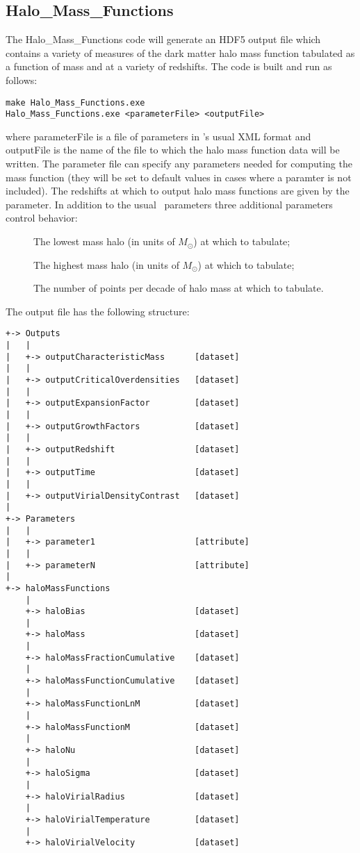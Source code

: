 \subsection{{\normalfont \ttfamily Halo\_Mass\_Functions}}

The {\normalfont \ttfamily Halo\_Mass\_Functions} code will generate an HDF5 output file which contains a variety of measures of the dark matter halo mass function tabulated as a function of mass and at a variety of redshifts. The code is built and run as follows:
\begin{verbatim}
make Halo_Mass_Functions.exe
Halo_Mass_Functions.exe <parameterFile> <outputFile>
\end{verbatim}
where {\normalfont \ttfamily parameterFile} is a file of parameters in \glc's usual XML format and {\normalfont \ttfamily outputFile} is the name of the file to which the halo mass function data will be written. The parameter file can specify any parameters needed for computing the mass function (they will be set to default values in cases where a paramter is not included). The redshifts at which to output halo mass functions are given by the {\normalfont \ttfamily [outputRedshifts]} parameter. In addition to the usual \glc\ parameters three additional parameters control behavior:
\begin{description}
\item [{\normalfont \ttfamily [haloMassFunctionsMassMinimum]}] The lowest mass halo (in units of $M_\odot$) at which to tabulate;
\item [{\normalfont \ttfamily [haloMassFunctionsMassMaximum]}] The highest mass halo (in units of $M_\odot$) at which to tabulate;
\item [{\normalfont \ttfamily [haloMassFunctionsPointsPerDecade]}] The number of points per decade of halo mass at which to tabulate.
\end{description}
The output file has the following structure:
\begin{verbatim}
+-> Outputs
|   |
|   +-> outputCharacteristicMass      [dataset]
|   |
|   +-> outputCriticalOverdensities   [dataset]
|   |
|   +-> outputExpansionFactor         [dataset]
|   |
|   +-> outputGrowthFactors           [dataset]
|   |
|   +-> outputRedshift                [dataset]
|   |
|   +-> outputTime                    [dataset]
|   |
|   +-> outputVirialDensityContrast   [dataset]
|    
+-> Parameters
|   |
|   +-> parameter1                    [attribute]
|   |
|   +-> parameterN                    [attribute]
|    
+-> haloMassFunctions
    |
    +-> haloBias                      [dataset]
    |
    +-> haloMass                      [dataset]
    |
    +-> haloMassFractionCumulative    [dataset]
    |
    +-> haloMassFunctionCumulative    [dataset]
    |
    +-> haloMassFunctionLnM           [dataset]
    |
    +-> haloMassFunctionM             [dataset]
    |
    +-> haloNu                        [dataset]
    |
    +-> haloSigma                     [dataset]
    |
    +-> haloVirialRadius              [dataset]
    |
    +-> haloVirialTemperature         [dataset]
    |
    +-> haloVirialVelocity            [dataset]
\end{verbatim}
